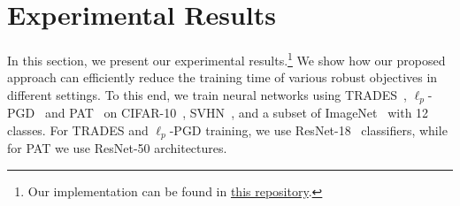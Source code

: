 \documentclass[runningheads]{llncs}
\begin{document}
\section{Experimental Results}\label{sec:experiments}

In this section, we present our experimental results.\footnote{Our implementation can be found in \href{https://github.com/hmdolatabadi/ACS}{this repository}.}
We show how our proposed approach can efficiently reduce the training time of various robust objectives in different settings.
To this end, we train neural networks using TRADES~\cite{zhang2019trades}, $\ell_p$-PGD~\cite{madry2018towards} and PAT~\cite{laidlaw2021pat} on CIFAR-10~\cite{krizhevsky2009learning}, SVHN~\cite{netzer2011reading}, and a subset of ImageNet~\cite{russakovsky2015imagenet} with 12 classes.
For TRADES and $\ell_p$-PGD training, we use ResNet-18~\cite{he2016deep} classifiers, while for PAT we use ResNet-50 architectures.
\end{document}
